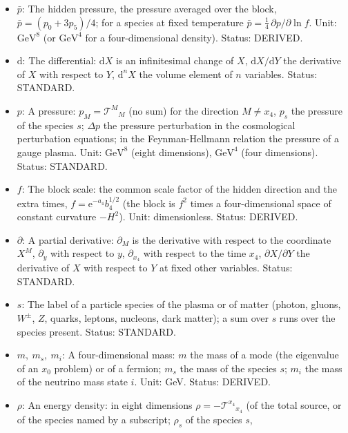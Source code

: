 \documentclass[
  10pt,
]{article}
\providecommand{\tightlist}{%
  \setlength{\itemsep}{0pt}\setlength{\parskip}{0pt}}
\begin{document}
\begin{itemize}
\tightlist
\item
  \(\bar p\): The hidden pressure, the pressure averaged over the block,
  \(\bar p = (p_0 + 3p_5)/4\); for a species at fixed temperature
  \(\bar p = \frac14\,\partial p/\partial\ln f\). Unit:
  \(\mathrm{GeV}^{8}\) (or \(\mathrm{GeV}^{4}\) for a four-dimensional
  density). Status: DERIVED.
\item
  \(\mathrm{d}\): The differential: \(\mathrm{d}X\) is an infinitesimal
  change of \(X\), \(\mathrm{d}X/\mathrm{d}Y\) the derivative of \(X\)
  with respect to \(Y\), \(\mathrm{d}^nX\) the volume element of \(n\)
  variables. Status: STANDARD.
\item
  \(p\): A pressure: \(p_M = \mathcal{T}^M{}_M\) (no sum) for the
  direction \(M \ne x_4\), \(p_s\) the pressure of the species \(s\);
  \(\Delta p\) the pressure perturbation in the cosmological
  perturbation equations; in the Feynman-Hellmann relation the pressure
  of a gauge plasma. Unit: \(\mathrm{GeV}^{8}\) (eight dimensions),
  \(\mathrm{GeV}^{4}\) (four dimensions). Status: STANDARD.
\item
  \(f\): The block scale: the common scale factor of the hidden
  direction and the extra times, \(f = \mathrm{e}^{-a_4}b_4^{1/2}\) (the
  block is \(f^2\) times a four-dimensional space of constant curvature
  \(-H^2\)). Unit: dimensionless. Status: DERIVED.
\item
  \(\partial\): A partial derivative: \(\partial_M\) is the derivative
  with respect to the coordinate \(X^M\), \(\partial_y\) with respect to
  \(y\), \(\partial_{x_4}\) with respect to the time \(x_4\),
  \(\partial X/\partial Y\) the derivative of \(X\) with respect to
  \(Y\) at fixed other variables. Status: STANDARD.
\item
  \(s\): The label of a particle species of the plasma or of matter
  (photon, gluons, \(W^\pm\), \(Z\), quarks, leptons, nucleons, dark
  matter); a sum over \(s\) runs over the species present. Status:
  STANDARD.
\item
  \(m,\ m_s,\ m_i\): A four-dimensional mass: \(m\) the mass of a mode
  (the eigenvalue of an \(x_0\) problem) or of a fermion; \(m_s\) the
  mass of the species \(s\); \(m_i\) the mass of the neutrino mass state
  \(i\). Unit: GeV. Status: DERIVED.
\item
  \(\rho\): An energy density: in eight dimensions
  \(\rho = -\mathcal{T}^{x_4}{}_{x_4}\) (of the total source, or of the
  species named by a subscript; \(\rho_s\) of the species \(s\),

\end{itemize}
\end{document}
